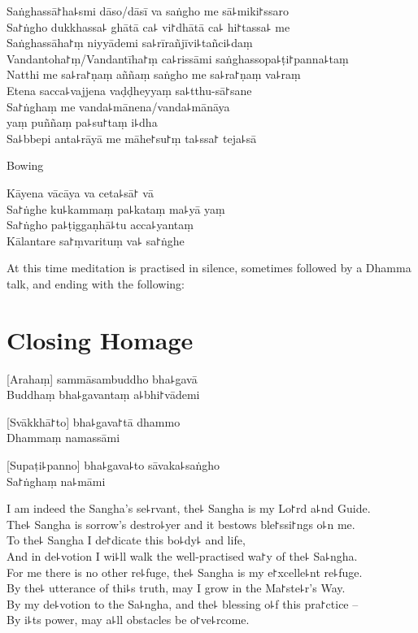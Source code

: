 \enlargethispage{\baselineskip}
\clearpage

Saṅghassā꜓ha꜕smi dāso/dāsī va saṅgho me sā꜕miki꜓ssaro\\%
Sa꜓ṅgho dukkhassa꜕ ghātā ca꜕ vi꜓dhātā ca꜕ hi꜓tassa꜕ me\\
Saṅghassāha꜓ṃ niyyādemi sa꜕rīrañjīvi꜕tañci꜕daṃ\\
Vandantoha꜓ṃ/Vandantīha꜓ṃ ca꜕rissāmi saṅghassopa꜕ṭi꜓panna꜕taṃ\\
Natthi me sa꜕ra꜓ṇaṃ aññaṃ saṅgho me sa꜕ra꜓ṇaṃ va꜕raṃ\\
Etena sacca꜕vajjena vaḍḍheyyaṃ sa꜕tthu-sā꜓sane\\
Sa꜓ṅghaṃ me vanda꜕mānena/vanda꜕mānāya\\
\vin yaṃ puññaṃ pa꜕su꜓taṃ i꜕dha\\
Sa꜕bbepi anta꜕rāyā me māhe꜓su꜓ṃ ta꜕ssa꜓ teja꜕sā

\begin{instruction}
  Bowing
\end{instruction}

Kāyena vācāya va ceta꜕sā꜓ vā\\
Sa꜓ṅghe ku꜕kammaṃ pa꜕kataṃ ma꜕yā yaṃ\\
Sa꜓ṅgho pa꜕ṭiggaṇhā꜕tu acca꜕yantaṃ\\
Kālantare sa꜓ṃvarituṃ va꜕ sa꜓ṅghe

\vfill

\begin{instruction}
  At this time meditation is practised in silence, sometimes followed by a Dhamma talk, and ending with the following:
\end{instruction}

\chapter{Closing Homage}%

[Arahaṃ] sammāsambuddho bha꜕gavā\\
Buddhaṃ bha꜕gavantaṃ a꜕bhi꜓vādemi 

[Svākkhā꜓to] bha꜕gava꜓tā dhammo\\
Dhammaṃ namassāmi 

[Supaṭi꜕panno] bha꜕gava꜕to sāvaka꜕saṅgho\\
Sa꜓ṅghaṃ na꜕māmi 

\clearpage

I am indeed the Sangha's se꜕rvant, the꜕ Sangha is my Lo꜓rd a꜕nd Guide.\\%
The꜕ Sangha is sorrow's destro꜕yer and it bestows ble꜓ssi꜓ngs o꜕n me.\\
To the꜕ Sangha I de꜓dicate this bo꜕dy꜕ and life,\\
And in de꜕votion I wi꜕ll walk the well-practised wa꜓y of the꜕ Sa꜕ngha.\\
For me there is no other re꜕fuge, the꜕ Sangha is my e꜓xcelle꜕nt re꜕fuge.\\
By the꜕ utterance of thi꜕s truth, may I grow in the Ma꜓ste꜕r's Way.\\
By my de꜕votion to the Sa꜕ngha, and the꜕ blessing o꜕f this pra꜓ctice --\\
By i꜕ts power, may a꜕ll obstacles be o꜓ve꜕rcome.

